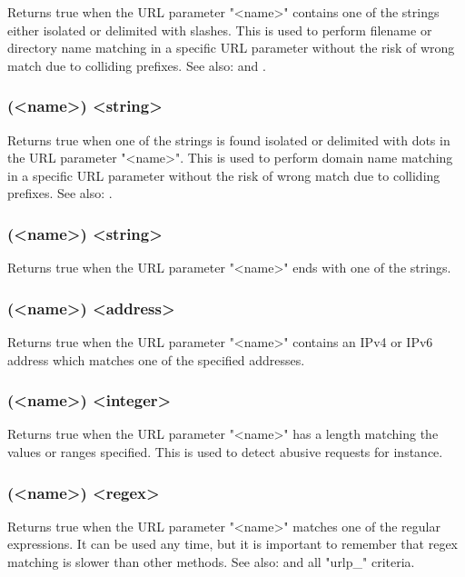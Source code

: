   Returns true when the URL parameter "<name>" contains one of the strings
  either isolated or delimited with slashes. This is used to perform filename
  or directory name matching in a specific URL parameter without the risk of
  wrong match due to colliding prefixes. See also:  and .

\subsubsection[urlp\_dom]{(<name>) <string>}

  Returns true when one of the strings is found isolated or delimited with dots
  in the URL parameter "<name>". This is used to perform domain name matching
  in a specific URL parameter without the risk of wrong match due to colliding
  prefixes. See also: .

\subsubsection[urlp\_end]{(<name>) <string>}

  Returns true when the URL parameter "<name>" ends with one of the strings.

\subsubsection[urlp\_ip]{(<name>) <address>}

  Returns true when the URL parameter "<name>" contains an IPv4 or IPv6 address
  which matches one of the specified addresses.

\subsubsection[urlp\_len]{(<name>) <integer>}

  Returns true when the URL parameter "<name>" has a length matching the values
  or ranges specified. This is used to detect abusive requests for instance.

\subsubsection[urlp\_reg]{(<name>) <regex>}

  Returns true when the URL parameter "<name>" matches one of the regular
  expressions. It can be used any time, but it is important to remember that
  regex matching is slower than other methods. See also:  and all
  "urlp\_" criteria.

